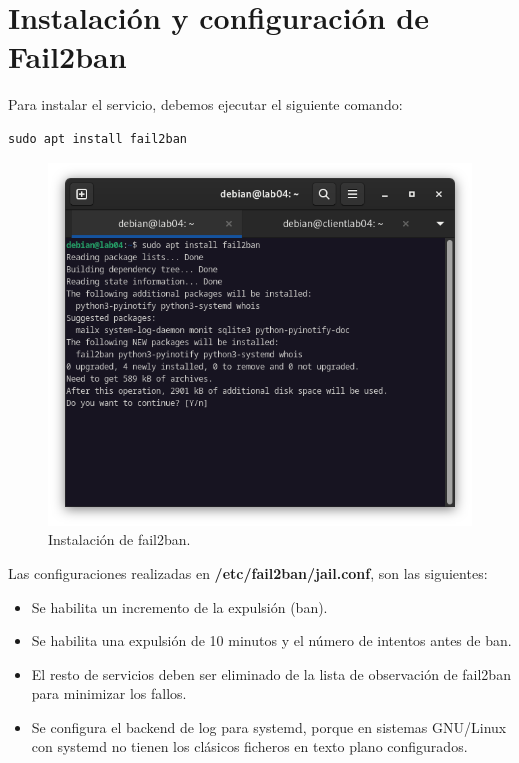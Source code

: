 
\section{Instalación y configuración de Fail2ban}

Para instalar el servicio, debemos ejecutar el siguiente comando:

\begin{lstlisting}[style=mybash]
sudo apt install fail2ban
\end{lstlisting}

\begin{figure}[H]
	\centering
	\includegraphics[scale=0.40]{00}
	\caption{Instalación de fail2ban.}
\end{figure}

Las configuraciones realizadas en \textbf{/etc/fail2ban/jail.conf}, son las siguientes:

\begin{itemize}
\item Se habilita un incremento de la expulsión (ban).
\item Se habilita una expulsión de 10 minutos y el número de intentos antes de ban.
\item El resto de servicios deben ser eliminado de la lista de observación de fail2ban para minimizar los fallos.
\item Se configura el backend de log para systemd, porque en sistemas GNU/Linux con systemd no tienen los clásicos ficheros en texto plano configurados.
\end{itemize}

